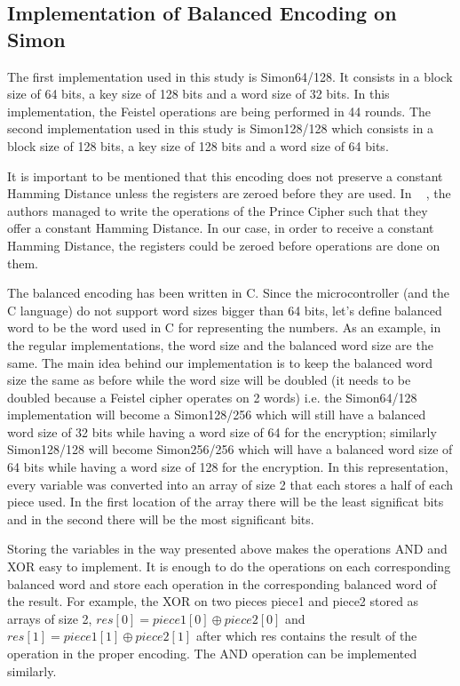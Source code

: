 \documentclass[conference]{IEEEtran}
\begin{document}
\subsection{Implementation of Balanced Encoding on Simon}

The first implementation used in this study is Simon64/128. It consists in a block size of 64 bits, a key size of 128 bits and a word size of 32 bits. In this implementation, the Feistel operations are being performed in 44 rounds. The second implementation used in this study is Simon128/128 which consists in a block size of 128 bits, a key size of 128 bits and a word size of 64 bits.

It is important to be mentioned that this encoding does not preserve a constant Hamming Distance unless the registers are zeroed before they are used. In ~\cite{BEPrince} , the authors managed to write the operations of the Prince Cipher such that they offer a constant Hamming Distance. In our case, in order to receive a constant Hamming Distance, the registers could be zeroed before operations are done on them.

The balanced encoding has been written in C. Since the microcontroller (and the C language) do not support word sizes bigger than 64 bits, let's define balanced word to be the word used in C for representing the numbers. As an example, in the regular implementations, the word size and the balanced word size are the same. The main idea behind our implementation is to keep the balanced word size the same as before while the word size will be doubled (it needs to be doubled because a Feistel cipher operates on 2 words) i.e. the Simon64/128 implementation will become a Simon128/256 which will still have a balanced word size of 32 bits while having a word size of 64 for the encryption; similarly Simon128/128 will become Simon256/256 which will have a balanced word size of 64 bits while having a word size of 128 for the encryption. In this representation, every variable was converted into an array of size 2 that each stores a half of each piece used. In the first location of the array there will be the least significat bits and in the second there will be the most significant bits.

Storing the variables in the way presented above makes the operations AND and XOR easy to implement. It is enough to do the operations on each corresponding balanced word and store each operation in the corresponding balanced word of the result. For example, the XOR on two pieces piece1 and piece2 stored as arrays of size 2, $res[0] = piece1[0] \oplus piece2[0]$ and $res[1] = piece1[1] \oplus piece2[1]$ after which res contains the result of the operation in the proper encoding. The AND operation can be implemented similarly.
\end{document}
